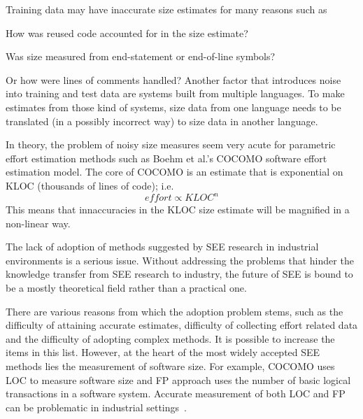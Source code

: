 Training data may have inaccurate size estimates
for many reasons such as
\bi
\item How was reused code accounted
for in the size estimate?
\item  Was size measured from end-statement
or end-of-line symbols?
\item Or how were lines of comments handled?
\ei
Another factor that introduces noise into training and test
data are systems built from multiple languages. 
To make estimates from  those kind
of systems, size data from  one language needs to be translated (in a possibly incorrect way) to size data in another language.

In theory, the  problem of noisy size measures seem very acute for parametric effort estimation
methods such as Boehm et al.'s COCOMO software effort estimation model.
The core of COCOMO  is an estimate that is exponential on KLOC (thousands of lines of code); i.e.
\[
\mathit{effort} \propto \mathit{KLOC}^n
\]
This means that innaccuracies in the 
 KLOC size estimate will be magnified in a non-linear way.

 

The lack of adoption of methods suggested by SEE research in industrial environments is a serious issue.
Without addressing the problems that hinder the knowledge transfer from SEE research to industry, the future of SEE is bound to be a mostly theoretical field rather than a practical one.

There are various reasons from which the adoption problem stems, such as the difficulty of attaining accurate estimates, difficulty of collecting effort related data and the difficulty of adopting complex methods.
It is possible to increase the items in this list.
However, at the heart of the most widely accepted SEE methods lies the measurement of software size.
For example, COCOMO uses LOC to measure software size and FP approach uses the number of basic logical transactions in a software system.
Accurate measurement of both LOC and FP can be problematic in industrial settings~\cite{Kocaguneli2011, Gollapudi2004}.

